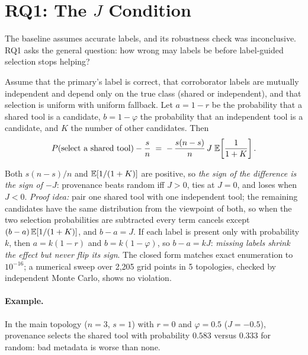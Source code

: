 \section{RQ1: The $J$ Condition}\label{sec:rq1}

The baseline assumes accurate labels, and its robustness check was inconclusive. RQ1 asks the general question: how wrong may labels be before label-guided selection stops helping?

\begin{theorem}\label{thm:j}
Assume that the primary's label is correct, that corroborator labels are mutually independent and depend only on the true class (shared or independent), and that selection is uniform with uniform fallback. Let $a = 1-r$ be the probability that a shared tool is a candidate, $b = 1-\varphi$ the probability that an independent tool is a candidate, and $K$ the number of other candidates. Then
\[
P(\text{select a shared tool}) - \frac{s}{n} \;=\; -\,\frac{s(n-s)}{n}\, J\; \mathbb{E}\!\left[\frac{1}{1+K}\right].
\]
\end{theorem}

Both $s(n-s)/n$ and $\mathbb{E}[1/(1+K)]$ are positive, so \emph{the sign of the difference is the sign of $-J$}: provenance beats random iff $J>0$, ties at $J=0$, and loses when $J<0$. \emph{Proof idea:} pair one shared tool with one independent tool; the remaining candidates have the same distribution from the viewpoint of both, so when the two selection probabilities are subtracted every term cancels except $(b-a)\,\mathbb{E}[1/(1+K)]$, and $b-a=J$. If each label is present only with probability $k$, then $a=k(1-r)$ and $b=k(1-\varphi)$, so $b-a=kJ$: \emph{missing labels shrink the effect but never flip its sign}. The closed form matches exact enumeration to $10^{-16}$; a numerical sweep over 2,205 grid points in 5 topologies, checked by independent Monte Carlo, shows no violation.

\paragraph{Example.} In the main topology ($n=3$, $s=1$) with $r=0$ and $\varphi=0.5$ ($J=-0.5$), provenance selects the shared tool with probability $0.583$ versus $0.333$ for random: bad metadata is worse than none.

